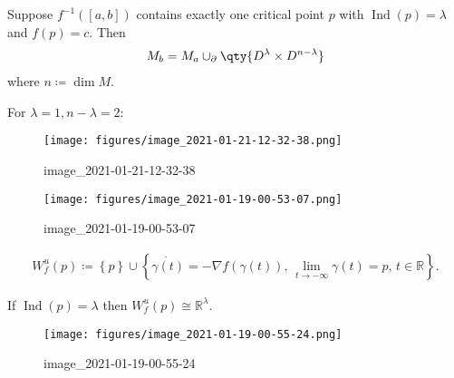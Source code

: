 \begin{theorem}[?]

Suppose \(f ^{-1} ([a, b])\) contains exactly one critical point \(p\)
with \(\mathop{\mathrm{Ind}}(p) = \lambda\) and \(f(p) = c\). Then
\begin{align*}
M_b = M_a \cup_{{{\partial}}} \qty{ D^ \lambda \times D^{n - \lambda} }
\end{align*}
where \(n \coloneqq\dim M\).

\end{theorem}

\begin{example}[?]

For \(\lambda= 1, n - \lambda= 2\):

\begin{figure}
\centering
\texttt{[image: figures/image\_2021-01-21-12-32-38.png]}
\caption{image\_2021-01-21-12-32-38}
\end{figure}

\end{example}

\begin{example}[?]

\begin{figure}
\centering
\texttt{[image: figures/image\_2021-01-19-00-53-07.png]}
\caption{image\_2021-01-19-00-53-07}
\end{figure}

\end{example}

\begin{definition}

\begin{align*}
W_f^u(p) \coloneqq\left\{{p}\right\} \cup\left\{{
\dot{\gamma(t)} = -\nabla f(\gamma(t)),\, \lim_{t\to -\infty} \gamma(t) = p,\, t\in {\mathbb{R}}
}\right\}
.\end{align*}

\end{definition}

\begin{lemma}[?]

If \(\mathop{\mathrm{Ind}}(p) = \lambda\) then
\(W_f^u(p) \cong {\mathbb{R}}^ \lambda\).

\end{lemma}

\begin{example}[?]

\begin{figure}
\centering
\texttt{[image: figures/image\_2021-01-19-00-55-24.png]}
\caption{image\_2021-01-19-00-55-24}
\end{figure}

\end{example}

